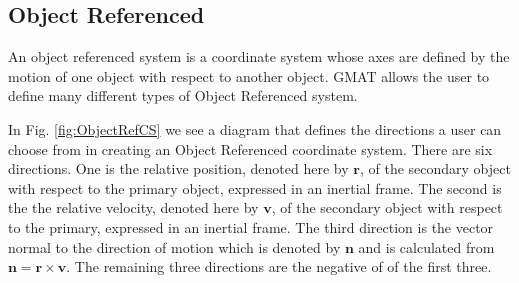 {%

\subsection{Object Referenced}

An object referenced system is a coordinate system whose axes are
defined by the motion of one object with respect to another
object. GMAT allows the user to define many different types of
Object Referenced system.
%
%
In Fig. \ref{fig:ObjectRefCS} we see a diagram that defines the
directions a user can choose from in creating an Object Referenced
coordinate system.  There are six directions.  One is the relative
position, denoted here by $\mathbf{r}$, of the secondary object
with respect to the primary object, expressed in an inertial
frame. The second is the the relative velocity, denoted here by
$\mathbf{v}$, of the secondary object with respect to the primary,
expressed in an inertial frame. The third direction is the vector
normal to the direction of motion which is denoted by $\mathbf{n}$
and is calculated from $\mathbf{n} = \mathbf{r} \times
\mathbf{v}$.  The remaining three directions are the negative of
of the first three.

}
